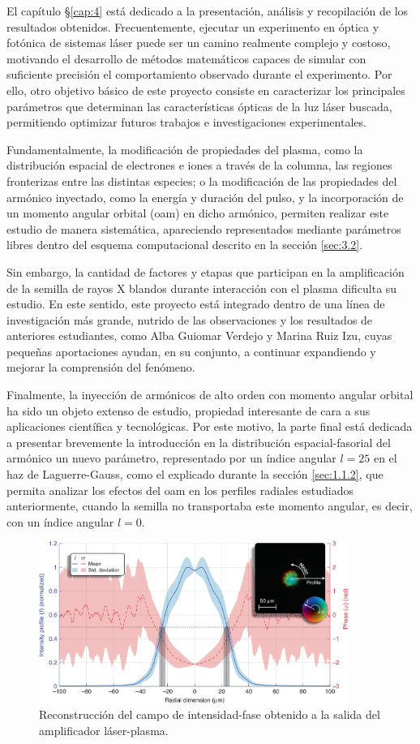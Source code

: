 El capítulo \S\ref{cap:4} está dedicado a la presentación, análisis y recopilación de los resultados obtenidos. Frecuentemente, ejecutar un experimento en óptica y fotónica de sistemas láser puede ser un camino realmente complejo y costoso, motivando el desarrollo de métodos matemáticos capaces de simular con suficiente precisión el comportamiento observado durante el experimento. Por ello, otro objetivo básico de este proyecto consiste en caracterizar los principales parámetros que determinan las características ópticas de la luz láser buscada, permitiendo optimizar futuros trabajos e investigaciones experimentales.

Fundamentalmente, la modificación de propiedades del plasma, como la distribución espacial de electrones e iones a través de la columna, las regiones fronterizas entre las distintas especies; o la modificación de las propiedades del armónico inyectado, como la energía y duración del pulso, y la incorporación de un momento angular orbital (\acrshort{oam}) en dicho armónico, permiten realizar este estudio de manera sistemática, apareciendo representados mediante parámetros libres dentro del esquema computacional descrito en la sección \ref{sec:3.2}.

Sin embargo, la cantidad de factores y etapas que participan en la amplificación de la semilla de rayos X blandos durante interacción con el plasma dificulta su estudio. En este sentido, este proyecto está integrado dentro de una línea de investigación más grande, nutrido de las observaciones y los resultados de anteriores estudiantes, como Alba Guiomar Verdejo y Marina Ruiz Izu, cuyas pequeñas aportaciones ayudan, en su conjunto, a continuar expandiendo y mejorar la comprensión del fenómeno.

Finalmente, la inyección de armónicos de alto orden con momento angular orbital ha sido un objeto extenso de estudio, propiedad interesante de cara a sus aplicaciones científica y tecnológicas. Por este motivo, la parte final está dedicada a presentar brevemente la introducción en la distribución espacial-fasorial del armónico un nuevo parámetro, representado por un índice angular $l=25$ en el haz de Laguerre-Gauss, como el explicado durante la sección \ref{sec:1.1.2}, que permita analizar los efectos del \acrshort{oam} en los perfiles radiales estudiados anteriormente, cuando la semilla no transportaba este momento angular, es decir, con un índice angular $l=0$.

\begin{figure}[htbp]
  \centering
  \includegraphics[width=0.9\textwidth]{Figuras/ch2_curvas_lab.png}
  \caption{Reconstrucción del campo de intensidad-fase obtenido a la salida del amplificador láser-plasma. \autocite{Tuitje2020}}
  \label{fig:2.2}
\end{figure}



